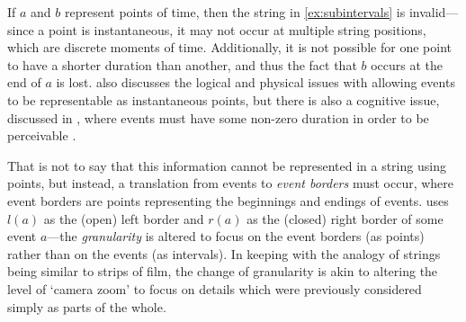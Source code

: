 \documentclass[a4paper,12pt,leqno]{article}
\begin{document}
If $a$ and $b$ represent points of time, then the string in \cref{ex:subintervals} is invalid---since a point is instantaneous, it may not occur at multiple string positions, which are discrete moments of time. Additionally, it is not possible for one point to have a shorter duration than another, and thus the fact that $b$ occurs at the end of $a$ is lost. \citet{allen1983maintaining} also discusses the logical and physical issues with allowing events to be representable as instantaneous points, but there is also a cognitive issue, discussed in \citet{Freksa1992}, where events must have some non-zero duration in order to be perceivable \citep{hamblin1972instants}.

That is not to say that this information cannot be represented in a string using points, but instead, a translation from events to \textit{event borders} must occur, where event borders are points representing the beginnings and endings of events. \citet{Fernando2018} uses $l(a)$ as the (open) left border and $r(a)$ as the (closed) right border of some event $a$---the \textit{granularity} is altered to focus on the event borders (as points) rather than on the events (as intervals). In keeping with the analogy of strings being similar to strips of film, the change of granularity is akin to altering the level of `camera zoom' to focus on details which were previously considered simply as parts of the whole.
\end{document}
